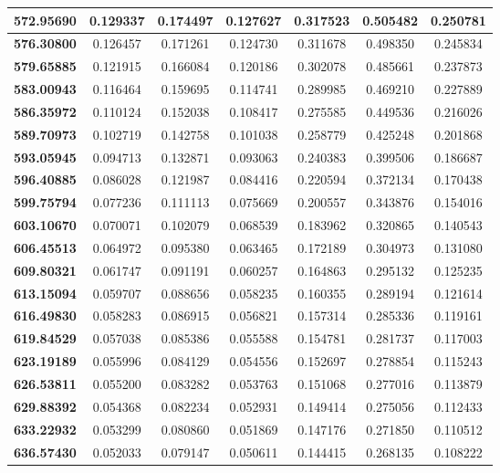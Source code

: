 \documentclass[10pt, a4paper]{article}
\begin{document}
\begin{appendices}
\begin{longtable}{|c|c|c|c|c|c|c|}
\textbf{572.95690} & 0.129337 & 0.174497 & 0.127627 & 0.317523 & 0.505482 & 0.250781 \\ \hline
\textbf{576.30800} & 0.126457 & 0.171261 & 0.124730 & 0.311678 & 0.498350 & 0.245834 \\ \hline
\textbf{579.65885} & 0.121915 & 0.166084 & 0.120186 & 0.302078 & 0.485661 & 0.237873 \\ \hline
\textbf{583.00943} & 0.116464 & 0.159695 & 0.114741 & 0.289985 & 0.469210 & 0.227889 \\ \hline
\textbf{586.35972} & 0.110124 & 0.152038 & 0.108417 & 0.275585 & 0.449536 & 0.216026 \\ \hline
\textbf{589.70973} & 0.102719 & 0.142758 & 0.101038 & 0.258779 & 0.425248 & 0.201868 \\ \hline
\textbf{593.05945} & 0.094713 & 0.132871 & 0.093063 & 0.240383 & 0.399506 & 0.186687 \\ \hline
\textbf{596.40885} & 0.086028 & 0.121987 & 0.084416 & 0.220594 & 0.372134 & 0.170438 \\ \hline
\textbf{599.75794} & 0.077236 & 0.111113 & 0.075669 & 0.200557 & 0.343876 & 0.154016 \\ \hline
\textbf{603.10670} & 0.070071 & 0.102079 & 0.068539 & 0.183962 & 0.320865 & 0.140543 \\ \hline
\textbf{606.45513} & 0.064972 & 0.095380 & 0.063465 & 0.172189 & 0.304973 & 0.131080 \\ \hline
\textbf{609.80321} & 0.061747 & 0.091191 & 0.060257 & 0.164863 & 0.295132 & 0.125235 \\ \hline
\textbf{613.15094} & 0.059707 & 0.088656 & 0.058235 & 0.160355 & 0.289194 & 0.121614 \\ \hline
\textbf{616.49830} & 0.058283 & 0.086915 & 0.056821 & 0.157314 & 0.285336 & 0.119161 \\ \hline
\textbf{619.84529} & 0.057038 & 0.085386 & 0.055588 & 0.154781 & 0.281737 & 0.117003 \\ \hline
\textbf{623.19189} & 0.055996 & 0.084129 & 0.054556 & 0.152697 & 0.278854 & 0.115243 \\ \hline
\textbf{626.53811} & 0.055200 & 0.083282 & 0.053763 & 0.151068 & 0.277016 & 0.113879 \\ \hline
\textbf{629.88392} & 0.054368 & 0.082234 & 0.052931 & 0.149414 & 0.275056 & 0.112433 \\ \hline
\textbf{633.22932} & 0.053299 & 0.080860 & 0.051869 & 0.147176 & 0.271850 & 0.110512 \\ \hline
\textbf{636.57430} & 0.052033 & 0.079147 & 0.050611 & 0.144415 & 0.268135 & 0.108222 \\ \hline

\end{longtable}
\end{appendices}
\end{document}
